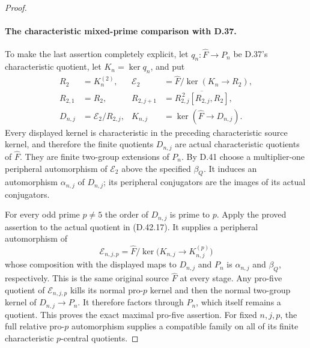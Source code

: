 \begin{proof}
\paragraph{The characteristic mixed-prime comparison with D.37.}
To make the last assertion completely
explicit, let \(q_n:\widehat F\to P_n\)
be D.37's characteristic quotient,
let \(K_n=\ker q_n\), and put
\[
 \begin{split}
 R_2&=K_n^{(2)},&
 \mathcal E_2&=\widehat F/\ker(K_n\to R_2),\\
 R_{2,1}&=R_2,&
 R_{2,j+1}&=\overline{R_{2,j}^{\,2}[R_{2,j},R_2]},\\
 D_{n,j}&=\mathcal E_2/R_{2,j},&
 K_{n,j}&=\ker(\widehat F\to D_{n,j}).
 \end{split}
 \tag{D.42.17}
\]
Every displayed kernel is characteristic
in the preceding characteristic source
kernel, and therefore the finite
quotients \(D_{n,j}\) are actual
characteristic quotients of \(\widehat F\).
They are finite two-group extensions
of \(P_n\).
By D.41 choose a multiplier-one
peripheral automorphism of
\(\mathcal E_2\) above the specified
\(\beta_Q\).
It induces an automorphism
\(\alpha_{n,j}\) of \(D_{n,j}\);
its peripheral conjugators are the
images of its actual conjugators.

For every odd prime \(p\ne5\) the
order of \(D_{n,j}\) is prime to \(p\).
Apply the proved assertion to the
actual quotient in \textup{(D.42.17)}.
It supplies a peripheral automorphism
of
\[
 \mathcal E_{n,j,p}
   =\widehat F/
      \ker\bigl(K_{n,j}\to K_{n,j}^{(p)}\bigr)
 \tag{D.42.18}
\]
whose composition with the displayed
maps to \(D_{n,j}\) and \(P_n\)
is \(\alpha_{n,j}\) and \(\beta_Q\),
respectively.
This is the same original source
\(\widehat F\) at every stage.
Any pro-five quotient of
\(\mathcal E_{n,j,p}\) kills its
normal pro-\(p\) kernel and then the
normal two-group kernel of
\(D_{n,j}\to P_n\).
It therefore factors through \(P_n\),
which itself remains a quotient.
This proves the exact maximal
pro-five assertion.
For fixed \(n,j,p\), the full relative
pro-\(p\) automorphism supplies a
compatible family on all of its
finite characteristic \(p\)-central
quotients.
\end{proof}


